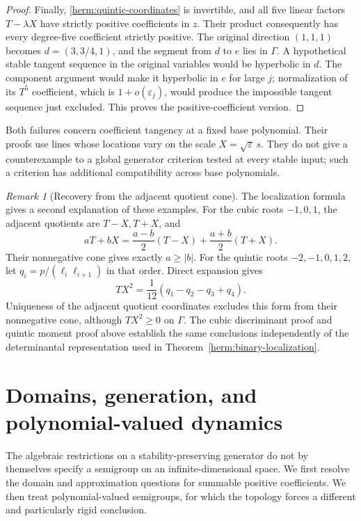 \documentclass[reqno]{amsart}
\theoremstyle{definition}
\theoremstyle{remark}
\newtheorem{remark}[theorem]{Remark}
\begin{document}
\begin{proof}
Finally, \eqref{herm:quintic-coordinates} is invertible, and all five
linear factors $T-\lambda X$ have strictly positive coefficients in
$z$.  Their product consequently has every degree-five coefficient
strictly positive.  The original direction $(1,1,1)$ becomes
$d=(3,3/4,1)$, and the segment from $d$ to $e$ lies in $\Gamma$.
A hypothetical stable tangent sequence in the original variables
would be hyperbolic in $d$.  The component argument would make it
hyperbolic in $e$ for large $j$; normalization of its $T^5$ coefficient,
which is $1+o(\varepsilon_j)$, would produce the impossible tangent
sequence just excluded.  This proves the positive-coefficient version.
\end{proof}

Both failures concern coefficient tangency at a fixed base polynomial.
Their proofs use lines whose locations vary on the scale
$X=\sqrt{\varepsilon}\,s$.  They do not give a counterexample to a
global generator criterion tested at every stable input; such a
criterion has additional compatibility across base polynomials.

\begin{remark}[Recovery from the adjacent quotient cone]
\label{herm:adjacent-recovery}
The localization formula gives a second explanation of these examples.
For the cubic roots $-1,0,1$, the adjacent quotients are $T-X,T+X$,
and
\[
 aT+bX=\frac{a-b}{2}(T-X)+\frac{a+b}{2}(T+X).
\]
Their nonnegative cone gives exactly $a\geq|b|$.  For the quintic
roots $-2,-1,0,1,2$, let $q_i=p/(\ell_i\ell_{i+1})$ in that order.
Direct expansion gives
\[
 TX^2=\frac1{12}(q_1-q_2-q_3+q_4).
\]
Uniqueness of the adjacent quotient coordinates excludes this form from
their nonnegative cone, although $TX^2\geq0$ on $\Gamma$.
The cubic discriminant proof and quintic moment proof above establish
the same conclusions independently of the determinantal representation
used in Theorem~\ref{herm:binary-localization}.
\end{remark}


\section{Domains, generation, and polynomial-valued dynamics}
\label{ana:section}

The algebraic restrictions on a stability-preserving generator do not by
themselves specify a semigroup on an infinite-dimensional space.  We first
resolve the domain and approximation questions for summable positive
coefficients.  We then treat polynomial-valued semigroups, for which the
topology forces a different and particularly rigid conclusion.
\end{document}
